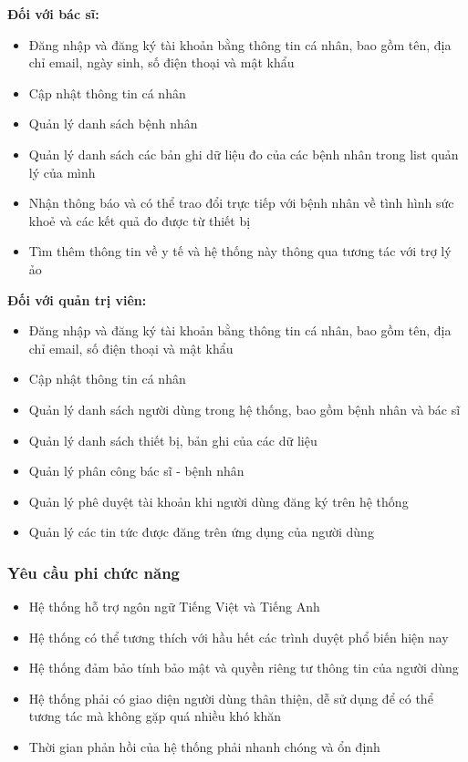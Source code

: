 \textbf{Đối với bác sĩ:}
\begin{adjustwidth}{1.5em}{}
\begin{itemize}
    \item Đăng nhập và đăng ký tài khoản bằng thông tin cá nhân, bao gồm tên, địa chỉ email, ngày sinh, số điện thoại và mật khẩu
    \item Cập nhật thông tin cá nhân
    \item Quản lý danh sách bệnh nhân
    \item Quản lý danh sách các bản ghi dữ liệu đo của các bệnh nhân trong list quản lý của mình
    \item Nhận thông báo và có thể trao đổi trực tiếp với bệnh nhân về tình hình sức khoẻ và các kết quả đo được từ thiết bị
    \item Tìm thêm thông tin về y tế và hệ thống này thông qua tương tác với trợ lý ảo 
\end{itemize}
\end{adjustwidth}
\textbf{Đối với quản trị viên:}
\begin{adjustwidth}{1.5em}{}
\begin{itemize}
    \item Đăng nhập và đăng ký tài khoản bằng thông tin cá nhân, bao gồm tên, địa chỉ email, số điện thoại và mật khẩu
    \item Cập nhật thông tin cá nhân
    \item Quản lý danh sách người dùng trong hệ thống, bao gồm bệnh nhân và bác sĩ
    \item Quản lý danh sách thiết bị, bản ghi của các dữ liệu
    \item Quản lý phân công bác sĩ - bệnh nhân
    \item Quản lý phê duyệt tài khoản khi người dùng đăng ký trên hệ thống
    \item Quản lý các tin tức được đăng trên ứng dụng của người dùng
\end{itemize}
\end{adjustwidth}

\subsubsection{Yêu cầu phi chức năng}
\begin{itemize}
    \item Hệ thống hỗ trợ ngôn ngữ Tiếng Việt và Tiếng Anh
    \item Hệ thống có thể tương thích với hầu hết các trình duyệt phổ biến hiện nay
    \item Hệ thống đảm bảo tính bảo mật và quyền riêng tư thông tin của người dùng
    \item Hệ thống phải có giao diện người dùng thân thiện, dễ sử dụng để có thể tương tác mà không gặp quá nhiều khó khăn
    \item Thời gian phản hồi của hệ thống phải nhanh chóng và ổn định
\end{itemize}

